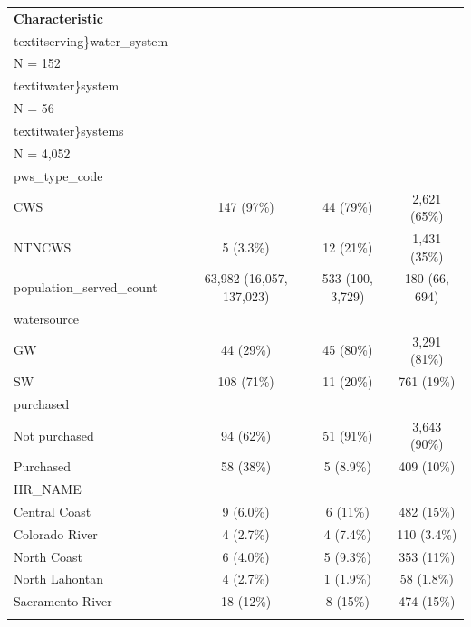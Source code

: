 \documentclass[
]{article}
\begin{document}
\begin{tabular}{l|c|c|c}
\hline
\textbf{Characteristic} & \makecell[c]{\textbf{carceral\\textit{serving\}water\_system}\ \ \\N = 152} & \makecell[c]{\textbf{carceral\\textit{water\}system}\ \ \\N = 56} & \makecell[c]{\textbf{other\\textit{water\}systems}\ \ \\N = 4,052}\\
\hline
pws\_type\_code &  &  & \\
\hline
\hspace{1em}CWS & 147 (97\%) & 44 (79\%) & 2,621 (65\%)\\
\hline
\hspace{1em}NTNCWS & 5 (3.3\%) & 12 (21\%) & 1,431 (35\%)\\
\hline
population\_served\_count & 63,982 (16,057, 137,023) & 533 (100, 3,729) & 180 (66, 694)\\
\hline
watersource &  &  & \\
\hline
\hspace{1em}GW & 44 (29\%) & 45 (80\%) & 3,291 (81\%)\\
\hline
\hspace{1em}SW & 108 (71\%) & 11 (20\%) & 761 (19\%)\\
\hline
purchased &  &  & \\
\hline
\hspace{1em}Not purchased & 94 (62\%) & 51 (91\%) & 3,643 (90\%)\\
\hline
\hspace{1em}Purchased & 58 (38\%) & 5 (8.9\%) & 409 (10\%)\\
\hline
HR\_NAME &  &  & \\
\hline
\hspace{1em}Central Coast & 9 (6.0\%) & 6 (11\%) & 482 (15\%)\\
\hline
\hspace{1em}Colorado River & 4 (2.7\%) & 4 (7.4\%) & 110 (3.4\%)\\
\hline
\hspace{1em}North Coast & 6 (4.0\%) & 5 (9.3\%) & 353 (11\%)\\
\hline
\hspace{1em}North Lahontan & 4 (2.7\%) & 1 (1.9\%) & 58 (1.8\%)\\
\hline
\hspace{1em}Sacramento River & 18 (12\%) & 8 (15\%) & 474 (15\%)\\
}}}
\end{tabular}
\end{document}
